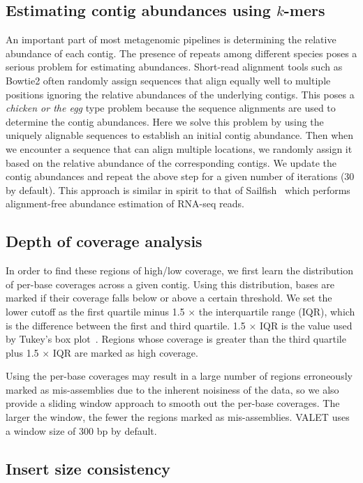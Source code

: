 \documentclass[12pt,\mydriver]{thesis}
\begin{document}
\subsection{Estimating contig abundances using $k$-mers}

An important part of most metagenomic pipelines is determining the relative abundance of each contig.
The presence of repeats among different species poses a serious problem for estimating abundances.
Short-read alignment tools such as Bowtie2 often randomly assign sequences that align equally well to multiple positions ignoring the relative abundances of the underlying contigs.
This poses a \emph{chicken or the egg} type problem because the sequence alignments are used to determine the contig abundances.
Here we solve this problem by using the uniquely alignable sequences to establish an initial contig abundance.
Then when we encounter a sequence that can align multiple locations, we randomly assign it based on the relative abundance of the corresponding contigs.
We update the contig abundances and repeat the above step for a given number of iterations (30 by default).
This approach is similar in spirit to that of Sailfish~\cite{patro2014sailfish} which performs alignment-free abundance estimation of RNA-seq reads.

\subsection{Depth of coverage analysis}

In order to find these regions of high/low coverage, we first learn the distribution of per-base coverages across a given contig.  Using this distribution, bases are marked if their coverage falls below or above a certain threshold.  We set the lower cutoff as the first quartile minus 1.5 $\times$ the interquartile range (IQR), which is the difference between the first and third quartile. 1.5 $\times$ IQR is the value used by Tukey’s box plot~\cite{mcgill1978variations}.  Regions whose coverage is greater than the third quartile plus 1.5 $\times$ IQR are marked as high coverage.

Using the per-base coverages may result in a large number of regions erroneously marked as mis-assemblies due to the inherent noisiness of the data, so we also provide a sliding window approach to smooth out the per-base coverages. The larger the window, the fewer the regions marked as mis-assemblies.
VALET uses a window size of 300 bp by default.

\subsection{Insert size consistency}
\end{document}
